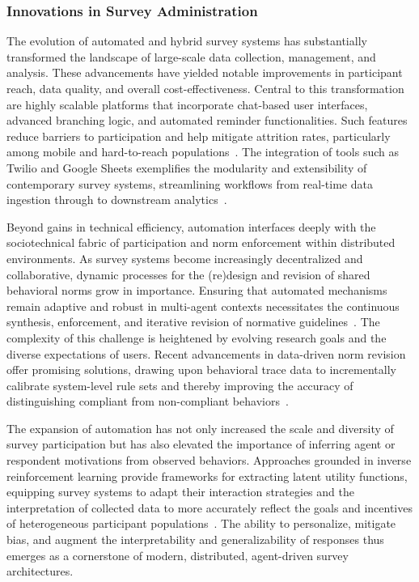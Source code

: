 \documentclass[sigconf]{acmart}
\begin{document}
\subsubsection{Innovations in Survey Administration}

The evolution of automated and hybrid survey systems has substantially transformed the landscape of large-scale data collection, management, and analysis. These advancements have yielded notable improvements in participant reach, data quality, and overall cost-effectiveness. Central to this transformation are highly scalable platforms that incorporate chat-based user interfaces, advanced branching logic, and automated reminder functionalities. Such features reduce barriers to participation and help mitigate attrition rates, particularly among mobile and hard-to-reach populations~\cite{ref117}. The integration of tools such as Twilio and Google Sheets exemplifies the modularity and extensibility of contemporary survey systems, streamlining workflows from real-time data ingestion through to downstream analytics~\cite{ref117}.

Beyond gains in technical efficiency, automation interfaces deeply with the sociotechnical fabric of participation and norm enforcement within distributed environments. As survey systems become increasingly decentralized and collaborative, dynamic processes for the (re)design and revision of shared behavioral norms grow in importance. Ensuring that automated mechanisms remain adaptive and robust in multi-agent contexts necessitates the continuous synthesis, enforcement, and iterative revision of normative guidelines~\cite{ref17}. The complexity of this challenge is heightened by evolving research goals and the diverse expectations of users. Recent advancements in data-driven norm revision offer promising solutions, drawing upon behavioral trace data to incrementally calibrate system-level rule sets and thereby improving the accuracy of distinguishing compliant from non-compliant behaviors~\cite{ref17}.

The expansion of automation has not only increased the scale and diversity of survey participation but has also elevated the importance of inferring agent or respondent motivations from observed behaviors. Approaches grounded in inverse reinforcement learning provide frameworks for extracting latent utility functions, equipping survey systems to adapt their interaction strategies and the interpretation of collected data to more accurately reflect the goals and incentives of heterogeneous participant populations~\cite{ref18}. The ability to personalize, mitigate bias, and augment the interpretability and generalizability of responses thus emerges as a cornerstone of modern, distributed, agent-driven survey architectures.
\end{document}

